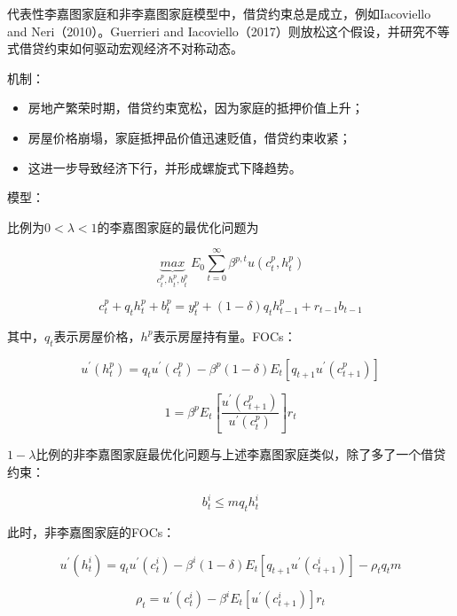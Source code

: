 \documentclass[cn,10pt,math=newtx,citestyle=gb7714-2015,bibstyle=gb7714-2015]{elegantbook}
\begin{document}
代表性李嘉图家庭和非李嘉图家庭模型中，借贷约束总是成立，例如Iacoviello and Neri（2010）。Guerrieri and Iacoviello（2017）则放松这个假设，并研究不等式借贷约束如何驱动宏观经济不对称动态。

机制：
\begin{itemize}
	\item 房地产繁荣时期，借贷约束宽松，因为家庭的抵押价值上升；
	
	\item 房屋价格崩塌，家庭抵押品价值迅速贬值，借贷约束收紧；
	
	\item 这进一步导致经济下行，并形成螺旋式下降趋势。
\end{itemize}


模型：

比例为$0<\lambda<1$的李嘉图家庭的最优化问题为

\begin{equation}\label{label}
	\underbrace{max}_{c_t^p,h_t^p,b_t^p}~E_0\sum_{t=0}^{\infty}\beta^{p,t}u(c_t^p,h_t^p)
\end{equation}

\begin{equation}\label{label}
	c_t^p+q_th_t^p+b_t^p=y_t^p+(1-\delta)q_th_{t-1}^p+r_{t-1}b_{t-1}
\end{equation}

其中，$q_t$表示房屋价格，$h^p$表示房屋持有量。FOCs：

\begin{equation}\label{label}
	u^{'}(h_t^p)=q_tu^{'}(c_t^p)-\beta^p(1-\delta)E_t[q_{t+1}u^{'}(c_{t+1}^p)]
\end{equation}

\begin{equation}\label{label}
	1=\beta^pE_t\left[\frac{u^{'}(c_{t+1}^p)}{u^{'}(c_{t}^p)}\right]r_t
\end{equation}

$1-\lambda$比例的非李嘉图家庭最优化问题与上述李嘉图家庭类似，除了多了一个借贷约束：

\begin{equation}\label{label}
	b_t^i\le mq_th_t^i
\end{equation}

此时，非李嘉图家庭的FOCs：

\begin{equation}\label{label}
	u^{'}(h_t^i)=q_tu^{'}(c_t^i)-\beta^i(1-\delta)E_t[q_{t+1}u^{'}(c_{t+1}^i)]-\rho_tq_tm
\end{equation}

\begin{equation}\label{label}
	\rho_t=u^{'}(c_{t}^i)-\beta^iE_t\left[u^{'}(c_{t+1}^i)\right]r_t
\end{equation}
\end{document}

